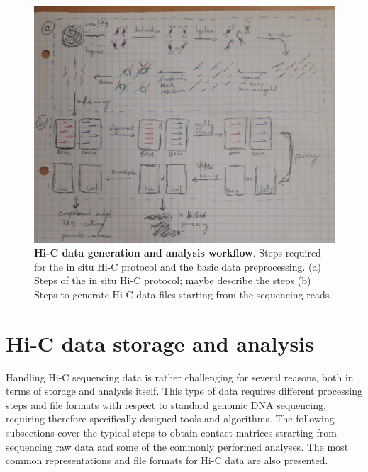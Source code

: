 \begin{figure}
  \centering
  \includegraphics[width=1\textwidth]{hic_pipeline.jpeg}
  \caption{\textbf{Hi-C data generation and analysis workflow}. Steps required for the in situ Hi-C protocol and the basic data preprocessing. (a) Steps of the in situ Hi-C protocol; maybe describe the steps (b) Steps to generate Hi-C data files starting from the sequencing reads.}
  \label{fig:pipeline}
\end{figure}

\section{Hi-C data storage and analysis}

Handling Hi-C sequencing data is rather challenging for several reasons, both in terms of storage and analysis itself. This type of data requires different processing steps and file formats with respect to standard genomic DNA sequencing, requiring therefore specifically designed tools and algorithms. The following subsections cover the typical steps to obtain contact matrices strarting from sequencing raw data and some of the commonly performed analyses\cite{hicprocessing2018}. The most common representations and file formats for Hi-C data are also presented.

